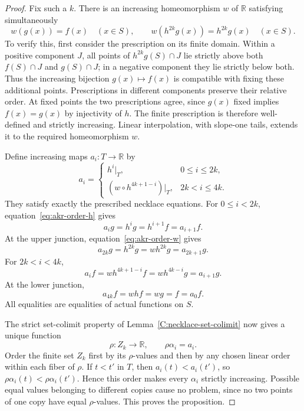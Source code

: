 \begin{proof}
Fix such a $k$. There is an increasing homeomorphism $w$ of
$\mathbb R$ satisfying simultaneously
\[
 w(g(x))=f(x)\quad(x\in S),\qquad
 w(h^{2k}g(x))=h^{2k}g(x)\quad(x\in S).
 \tag{W}\label{eq:akr-order-w}
\]
To verify this, first consider the prescription on its finite domain.
Within a positive component $J$, all points of $h^{2k}g(S)\cap J$
lie strictly above both $f(S)\cap J$ and $g(S)\cap J$; in a negative
component they lie strictly below both. Thus the increasing bijection
$g(x)\mapsto f(x)$ is compatible with fixing these additional points.
Prescriptions in different components preserve their relative order.
At fixed points the two prescriptions agree, since $g(x)$ fixed implies
$f(x)=g(x)$ by injectivity of $h$. The finite prescription is therefore
well-defined and strictly increasing. Linear interpolation, with
slope-one tails, extends it to the required homeomorphism $w$.

Define increasing maps $a_i:T\to\mathbb R$ by
\[
 a_i=
 \begin{cases}
 h^i|_T,&0\leq i\leq2k,\\
 (w\circ h^{4k+1-i})|_T,&2k<i\leq4k.
 \end{cases}
\]
They satisfy exactly the prescribed necklace equations. For
$0\leq i<2k$, equation~\eqref{eq:akr-order-h} gives
\[
 a_i g=h^i g=h^{i+1}f=a_{i+1}f.
\]
At the upper junction, equation~\eqref{eq:akr-order-w} gives
\[
 a_{2k}g=h^{2k}g=w h^{2k}g=a_{2k+1}g.
\]
For $2k<i<4k$,
\[
 a_i f=w h^{4k+1-i}f=w h^{4k-i}g=a_{i+1}g.
\]
At the lower junction,
\[
 a_{4k}f=w h f=w g=f=a_0f.
\]
All equalities are equalities of actual functions on $S$.

The strict set-colimit property of
Lemma~\ref{C:necklace-set-colimit} now gives a unique function
\[
 \rho:Z_k\longrightarrow\mathbb R,
 \qquad \rho\alpha_i=a_i.
\]
Order the finite set $Z_k$ first by its $\rho$-values and then by any
chosen linear order within each fiber of $\rho$. If $t<t'$ in $T$,
then $a_i(t)<a_i(t')$, so
$\rho\alpha_i(t)<\rho\alpha_i(t')$. Hence this order makes every
$\alpha_i$ strictly increasing. Possible equal values belonging to
different copies cause no problem, since no two points of one copy
have equal $\rho$-values. This proves the proposition.
\end{proof}

